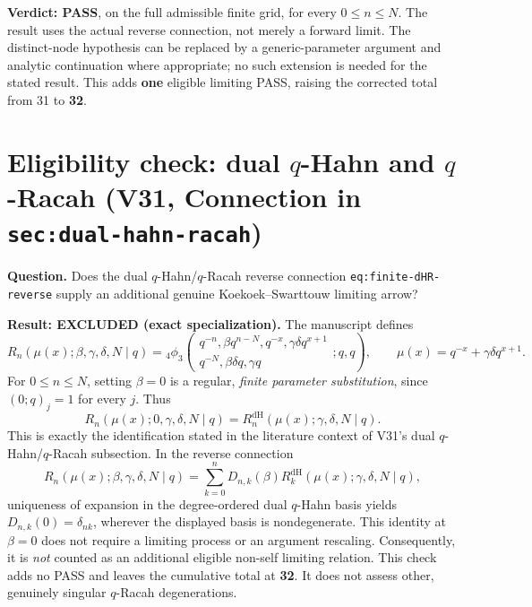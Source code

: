 \documentclass[11pt]{article}
\begin{document}
\noindent\textbf{Verdict: PASS}, on the full admissible finite grid,
for every $0\le n\le N$. The result uses the actual reverse
connection, not merely a forward limit. The distinct-node hypothesis
can be replaced by a generic-parameter argument and analytic
continuation where appropriate; no such extension is needed for the
stated result. This adds \textbf{one} eligible limiting PASS, raising
the corrected total from 31 to \textbf{32}.


\section{Eligibility check: dual $q$-Hahn and $q$-Racah (V31, Connection  in \texttt{sec:dual-hahn-racah})}
\noindent\textbf{Question.} Does the dual $q$-Hahn/$q$-Racah reverse connection \texttt{eq:finite-dHR-reverse} supply an additional genuine Koekoek--Swarttouw limiting arrow?

\noindent\textbf{Result: EXCLUDED (exact specialization).} The manuscript defines
\[
R_n(\mu(x);\beta,\gamma,\delta,N\mid q)
={}_4\phi_3\!\left(\begin{matrix}q^{-n},\beta q^{n-N},q^{-x},\gamma\delta q^{x+1}\\
q^{-N},\beta\delta q,\gamma q\end{matrix};q,q\right),
\qquad \mu(x)=q^{-x}+\gamma\delta q^{x+1}.
\]
For $0\le n\le N$, setting $\beta=0$ is a regular, \emph{finite parameter substitution}, since $(0;q)_j=1$ for every $j$. Thus
\[
\boxed{R_n(\mu(x);0,\gamma,\delta,N\mid q)
=R_n^{\mathrm{dH}}(\mu(x);\gamma,\delta,N\mid q)}.
\]
This is exactly the identification stated in the literature context of V31's dual $q$-Hahn/$q$-Racah subsection. In the reverse connection
\[
R_n(\mu(x);\beta,\gamma,\delta,N\mid q)
=\sum_{k=0}^n D_{n,k}(\beta)
R_k^{\mathrm{dH}}(\mu(x);\gamma,\delta,N\mid q),
\]
uniqueness of expansion in the degree-ordered dual $q$-Hahn basis yields
$D_{n,k}(0)=\delta_{nk}$, wherever the displayed basis is nondegenerate.
This identity at $\beta=0$ does not require a limiting process or an
argument rescaling. Consequently, it is \emph{not} counted as an additional
eligible non-self limiting relation. This check adds no PASS and leaves the
cumulative total at \textbf{32}. It does not assess other, genuinely
singular $q$-Racah degenerations.
\end{document}
